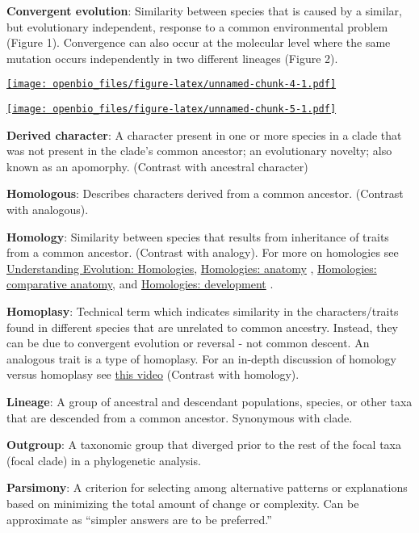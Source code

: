 \documentclass[
]{book}
\begin{document}
\textbf{Convergent evolution}: Similarity between species that is caused by a similar, but evolutionary independent, response to a common environmental problem (Figure 1). Convergence can also occur at the molecular level where the same mutation occurs independently in two different lineages (Figure 2).

\href{https://wp.biologos.org/wp-content/uploads/2018/10/venema_23_1.jpg}{\texttt{[image: openbio\_files/figure-latex/unnamed-chunk-4-1.pdf]}}

\href{https://wp.biologos.org/wp-content/uploads/2018/10/venema_22_7.jpg}{\texttt{[image: openbio\_files/figure-latex/unnamed-chunk-5-1.pdf]}}

\textbf{Derived character}: A character present in one or more species in a clade that was not present in the clade's common ancestor; an evolutionary novelty; also known as an apomorphy. (Contrast with ancestral character)

\textbf{Homologous}: Describes characters derived from a common ancestor. (Contrast with analogous).

\textbf{Homology}: Similarity between species that results from inheritance of traits from a common ancestor. (Contrast with analogy). For more on homologies see \href{https://evolution.berkeley.edu/evolibrary/article/0_0_0/lines_04}{Understanding Evolution: Homologies}, \href{https://evolution.berkeley.edu/evolibrary/article/0_0_0/lines_05}{Homologies: anatomy} , \href{https://evolution.berkeley.edu/evolibrary/article/0_0_0/lines_06}{Homologies: comparative anatomy}, and \href{https://evolution.berkeley.edu/evolibrary/article/0_0_0/lines_07}{Homologies: development} .

\textbf{Homoplasy}: Technical term which indicates similarity in the characters/traits found in different species that are unrelated to common ancestry. Instead, they can be due to convergent evolution or reversal - not common descent. An analogous trait is a type of homoplasy. For an in-depth discussion of homology versus homoplasy see \href{https://www.youtube.com/watch?v=W-APHQ94gog}{this video} (Contrast with homology).

\textbf{Lineage}: A group of ancestral and descendant populations, species, or other taxa that are descended from a common ancestor. Synonymous with clade.

\textbf{Outgroup}: A taxonomic group that diverged prior to the rest of the focal taxa (focal clade) in a phylogenetic analysis.

\textbf{Parsimony}: A criterion for selecting among alternative patterns or explanations based on minimizing the total amount of change or complexity. Can be approximate as ``simpler answers are to be preferred.''
\end{document}
